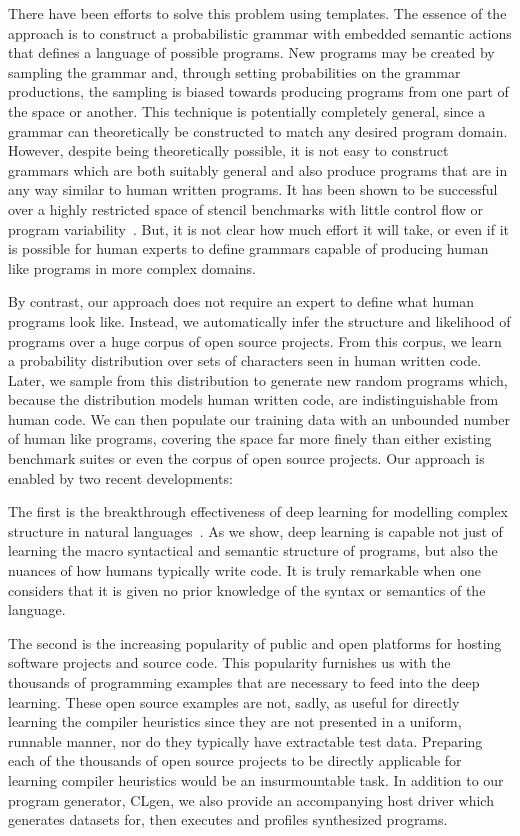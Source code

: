 There have been efforts to solve this problem using templates. The essence of the approach is to construct a probabilistic grammar with embedded semantic actions that defines a language of possible programs. New programs may be created by sampling the grammar and, through setting probabilities on the grammar productions, the sampling is biased towards producing programs from one part of the space or another. This technique is potentially completely general, since a grammar can theoretically be constructed to match any desired program domain. However, despite being theoretically possible, it is not easy to construct grammars which are both suitably general and also produce programs that are in any way similar to human written programs. It has been shown to be successful over a highly restricted space of stencil benchmarks with little control flow or program variability~\cite{Falch2015,Cummins2016}. But, it is not clear how much effort it will take, or even if it is possible for human experts to define grammars capable of producing human like programs in more complex domains.

By contrast, our approach does not require an expert to define what human programs look like. Instead, we automatically infer the structure and likelihood of programs over a huge corpus of open source projects. From this corpus, we learn a probability distribution over sets of characters seen in human written code. Later, we sample from this distribution to generate new random programs which, because the distribution models human written code, are indistinguishable from human code. We can then populate our training data with an unbounded number of human like programs, covering the space far more finely than either existing benchmark suites or even the corpus of open source projects. Our approach is enabled by two recent developments:

The first is the breakthrough effectiveness of deep learning for modelling complex structure in natural languages~\cite{Graves2013,Sutskever2014}. As we show, deep learning is capable not just of learning the macro syntactical and semantic structure of programs, but also the nuances of how humans typically write code. It is truly remarkable when one considers that it is given no prior knowledge of the syntax or semantics of the language.

The second is the increasing popularity of public and open platforms for hosting software projects and source code. This popularity furnishes us with the thousands of programming examples that are necessary to feed into the deep learning. These open source examples are not, sadly, as useful for directly learning the compiler heuristics since they are not presented in a uniform, runnable manner, nor do they typically have extractable test data. Preparing each of the thousands of open source projects to be directly applicable for learning compiler heuristics would be an insurmountable task. In addition to our program generator, CLgen, we also provide an accompanying host driver which generates datasets for, then executes and profiles synthesized programs.

